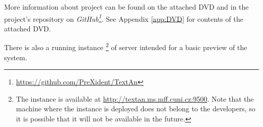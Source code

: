 
More information about \textan{} project can be found on the attached DVD and in
the project's repository on \emph{GitHub\footnote{\url{https://github.com/PreXident/TextAn}}}.
See Appendix \ref{app:DVD} for contents of the attached DVD.

There is also a running instance%
\footnote{The instance is available at \url{http://textan.ms.mff.cuni.cz:9500}.
Note that the machine where the instance is deployed does not belong to the
developers, so it is possible that it will not be available in the future.} of
\textan{} server intended for a basic preview of the system.
